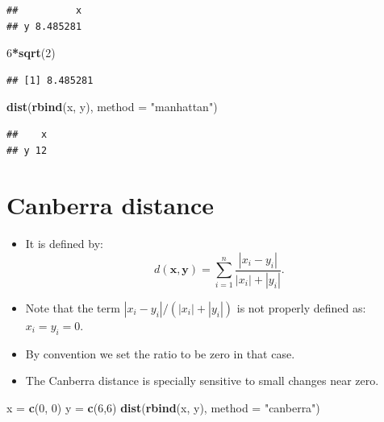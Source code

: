 \documentclass[
]{article}
\newenvironment{Shaded}{\begin{snugshade}}{\end{snugshade}}
\newcommand{\DataTypeTok}[1]{\textcolor[rgb]{0.13,0.29,0.53}{#1}}
\newcommand{\DecValTok}[1]{\textcolor[rgb]{0.00,0.00,0.81}{#1}}
\newcommand{\KeywordTok}[1]{\textcolor[rgb]{0.13,0.29,0.53}{\textbf{#1}}}
\newcommand{\NormalTok}[1]{#1}
\newcommand{\OperatorTok}[1]{\textcolor[rgb]{0.81,0.36,0.00}{\textbf{#1}}}
\newcommand{\StringTok}[1]{\textcolor[rgb]{0.31,0.60,0.02}{#1}}
\begin{document}
\begin{verbatim}
##          x
## y 8.485281
\end{verbatim}

\begin{Shaded}
\begin{Highlighting}[]
\DecValTok{6}\OperatorTok{*}\KeywordTok{sqrt}\NormalTok{(}\DecValTok{2}\NormalTok{)}
\end{Highlighting}
\end{Shaded}

\begin{verbatim}
## [1] 8.485281
\end{verbatim}

\begin{Shaded}
\begin{Highlighting}[]
\KeywordTok{dist}\NormalTok{(}\KeywordTok{rbind}\NormalTok{(x, y), }\DataTypeTok{method =} \StringTok{"manhattan"}\NormalTok{)}
\end{Highlighting}
\end{Shaded}

\begin{verbatim}
##    x
## y 12
\end{verbatim}

\hypertarget{canberra-distance}{%
\section{Canberra distance}\label{canberra-distance}}

\begin{itemize}
\item
  It is defined by: \[d(\mathbf{x},\mathbf{y})=\sum_{i=1}^n
  \frac{|x_i-y_i|}{|x_i|+|y_i|}.\]
\item
  Note that the term \(|x_i-y_i|/(|x_i|+|y_i|)\) is not properly defined
  as: \(x_i=y_i=0\).
\item
  By convention we set the ratio to be zero in that case.
\item
  The Canberra distance is specially sensitive to small changes near
  zero.
\end{itemize}

\begin{Shaded}
\begin{Highlighting}[]
\NormalTok{x =}\StringTok{ }\KeywordTok{c}\NormalTok{(}\DecValTok{0}\NormalTok{, }\DecValTok{0}\NormalTok{)}
\NormalTok{y =}\StringTok{ }\KeywordTok{c}\NormalTok{(}\DecValTok{6}\NormalTok{,}\DecValTok{6}\NormalTok{)}
\KeywordTok{dist}\NormalTok{(}\KeywordTok{rbind}\NormalTok{(x, y), }\DataTypeTok{method =} \StringTok{"canberra"}\NormalTok{)}
\end{Highlighting}
\end{Shaded}
\end{document}
